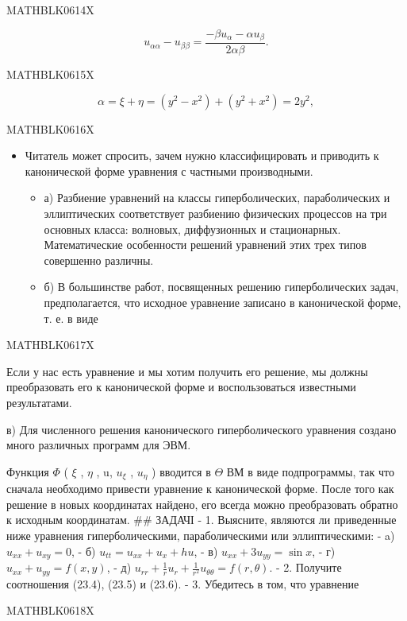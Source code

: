 \documentclass[
  ukrainian,
]{article}
\providecommand{\tightlist}{%
  \setlength{\itemsep}{0pt}\setlength{\parskip}{0pt}}
\begin{document}
MATHBLK0614X

\[
u_{\alpha\alpha} - u_{\beta\beta} = \frac{-\beta u_{\alpha} - \alpha u_{\beta}}{2\alpha\beta}.
\]

MATHBLK0615X

\[
\alpha = \xi + \eta = (y^2 - x^2) + (y^2 + x^2) = 2y^2,
\]

MATHBLK0616X

\begin{itemize}
\tightlist
\item
  Читатель может спросить, зачем нужно классифицировать и приводить к
  канонической форме уравнения с частными производными.

  \begin{itemize}
  \tightlist
  \item
    а) Разбиение уравнений на классы гиперболических, параболических и
    эллиптических соответствует разбиению физических процессов на три
    основных класса: волновых, диффузионных и стационарных.
    Математические особенности решений уравнений этих трех типов
    совершенно различны.
  \item
    б) В большинстве работ, посвященных решению гиперболических задач,
    предполагается, что исходное уравнение записано в канонической
    форме, т. е. в виде
  \end{itemize}
\end{itemize}

MATHBLK0617X

Если у нас есть уравнение и мы хотим получить его решение, мы должны
преобразовать его к канонической форме и воспользоваться известными
результатами.

в) Для численного решения канонического гиперболического уравнения
создано много различных программ для ЭВМ.

Функция \(\Phi\) ( \(\xi\) , \(\eta\) , u, \(u_{\xi}\) , \(u_{\eta}\) )
вводится в \(\Theta\) ВМ в виде подпрограммы, так что сначала необходимо
привести уравнение к канонической форме. После того как решение в новых
координатах найдено, его всегда можно преобразовать обратно к исходным
координатам. \#\# ЗАДАЧІ - 1. Выясните, являются ли приведенные ниже
уравнения гиперболическими, параболическими или эллиптическими: - a)
\(u_{xx}+u_{xy}=0\), - б) \(u_{tt}=u_{xx}+u_x+hu\), - в)
\(u_{xx}+3u_{yy}=\sin x\), - г) \(u_{xx}+u_{yy}=f(x,y)\), - д)
\(u_{rr}+\frac{1}{r}u_r+\frac{1}{r^2}u_{\theta\theta}=f(r,\theta)\). -
2. Получите соотношения (23.4), (23.5) и (23.6). - 3. Убедитесь в том,
что уравнение

MATHBLK0618X
\end{document}

